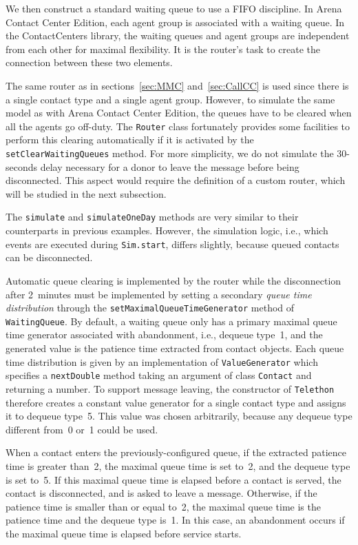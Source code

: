 We then construct a standard waiting queue to use a FIFO discipline.
In Arena Contact Center Edition, each agent group is associated with a
waiting queue.  In the
ContactCenters library, the waiting queues and agent groups are
independent from each other for maximal flexibility.  It is the
router's task to create the connection between these two elements.

The same router as in sections~\ref{sec:MMC} and~\ref{sec:CallCC} is
used since there
is a single contact type and a single agent group.  However, to simulate the
same model as with Arena Contact Center Edition, the queues have to be
cleared when all the
agents go off-duty.  The \texttt{Router} class fortunately provides
some facilities to perform this clearing automatically if it is
activated by the \texttt{set\-Clear\-Waiting\-Queues} method.
For more simplicity, we do not simulate the
30-seconds delay necessary for a donor to leave the message before
being disconnected.  This aspect would require the definition of a
custom router, which will be studied in the next subsection.

The \texttt{simulate} and \texttt{simulate\-One\-Day} methods are very
similar to their counterparts in previous examples. However, the
simulation logic, i.e., which events are executed during
\texttt{Sim.start}, differs slightly, because queued contacts can be
disconnected.

Automatic queue clearing is implemented by the router while the
disconnection after 2~minutes must be implemented
by setting a secondary \emph{queue
  time distribution} through the \texttt{set\-Maximal\-Queue\-Time\-Generator}
method of \texttt{Waiting\-Queue}.  By default, a waiting queue only
has a
primary maximal queue time generator associated with abandonment,
i.e., dequeue type~1, and the
generated value is the patience time extracted from contact objects.
Each queue time distribution is given by an implementation of
\texttt{Value\-Generator} which specifies a \texttt{next\-Double}
method taking an argument of class \texttt{Contact} and returning a
number.  To support message leaving,
the constructor of \texttt{Telethon}
therefore creates a constant value generator for a
single contact
type and assigns it to dequeue type~5.  This value was chosen
arbitrarily, because any dequeue type
different from~0 or~1 could be used.

When a contact enters the previously-configured queue, if the
extracted patience time is greater than~2, the
maximal queue time is set to~2, and the dequeue type is set to~5.  If this
maximal queue time is elapsed before a contact is served, the contact
is disconnected, and is asked to leave a message.
Otherwise, if the patience time is smaller than or equal to~2, the
maximal queue
time is the patience time and the
dequeue type is~1.  In this case, an abandonment occurs if the maximal
queue time is elapsed before service starts.

